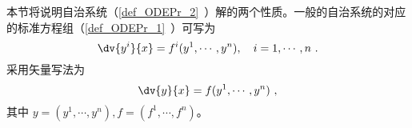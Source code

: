 
本节将说明自治系统（\autoref{def_ODEPr_2}~）解的两个性质。一般的自治系统的对应的标准方程组（\autoref{def_ODEPr_1}~）可写为
\begin{equation}
\dv{y^i}{x}=f^i(y^1,\cdots,y^n),\quad i=1,\cdots,n~.
\end{equation}
采用矢量写法为
\begin{equation}
\dv{y}{x}=f(y^1,\cdots,y^n)~,
\end{equation}
其中 $y=(y^1,\cdots,y^n),f=(f^1,\cdots,f^n)$。
